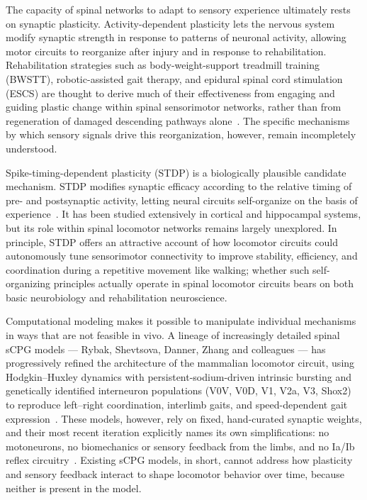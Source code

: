 The capacity of spinal networks to adapt to sensory experience ultimately
rests on synaptic plasticity. Activity-dependent plasticity lets the nervous
system modify synaptic strength in response to patterns of neuronal
activity, allowing motor circuits to reorganize after injury and in response
to rehabilitation. Rehabilitation strategies such as body-weight-support
treadmill training (BWSTT), robotic-assisted gait therapy, and epidural
spinal cord stimulation (ESCS) are thought to derive much of their
effectiveness from engaging and guiding plastic change within spinal
sensorimotor networks, rather than from regeneration of damaged descending
pathways alone~\cite{courtine2009,edgerton2008}. The specific mechanisms by
which sensory signals drive this reorganization, however, remain
incompletely understood.

Spike-timing-dependent plasticity (STDP) is a biologically plausible
candidate mechanism. STDP modifies synaptic efficacy according to the
relative timing of pre- and postsynaptic activity, letting neural circuits
self-organize on the basis of experience~\cite{biPoo1998,morrison2007}. It
has been studied extensively in cortical and hippocampal systems, but its
role within spinal locomotor networks remains largely unexplored. In
principle, STDP offers an attractive account of how locomotor circuits could
autonomously tune sensorimotor connectivity to improve stability,
efficiency, and coordination during a repetitive movement like walking;
whether such self-organizing principles actually operate in spinal locomotor
circuits bears on both basic neurobiology and rehabilitation neuroscience.

Computational modeling makes it possible to manipulate individual
mechanisms in ways that are not feasible in vivo. A lineage of increasingly
detailed spinal sCPG models --- Rybak, Shevtsova, Danner, Zhang and
colleagues --- has progressively refined the architecture of the mammalian
locomotor circuit, using Hodgkin--Huxley dynamics with persistent-sodium-driven
intrinsic bursting and genetically identified interneuron populations (V0V,
V0D, V1, V2a, V3, Shox2) to reproduce left--right coordination, interlimb
gaits, and speed-dependent gait
expression~\cite{rybak2006,shevtsova2015,danner2017,zhang2022}. These models,
however, rely on fixed, hand-curated synaptic weights, and their most recent
iteration explicitly names its own simplifications: no motoneurons, no
biomechanics or sensory feedback from the limbs, and no Ia/Ib reflex
circuitry~\cite{zhang2022}. Existing sCPG models, in short, cannot address
how plasticity and sensory feedback interact to shape locomotor behavior
over time, because neither is present in the model.

